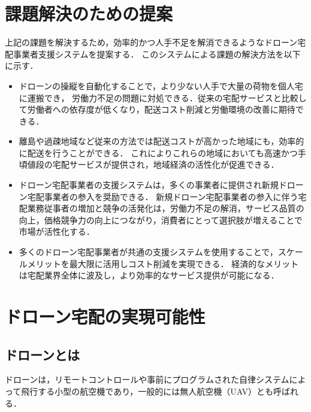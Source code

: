 \documentclass[a4paper, titlepage]{jsarticle}
\begin{document}
\section{課題解決のための提案}
上記の課題を解決するため，効率的かつ人手不足を解消できるようなドローン宅配事業者支援システムを提案する．
このシステムによる課題の解決方法を以下に示す．
\begin{itemize}
        \item ドローンの操縦を自動化することで，より少ない人手で大量の荷物を個人宅に運搬でき，
              労働力不足の問題に対処できる．従来の宅配サービスと比較して労働者への依存度が低くなり，配送コスト削減と労働環境の改善に期待できる．

        \item 離島や過疎地域など従来の方法では配送コストが高かった地域にも，効率的に配送を行うことができる．
              これによりこれらの地域においても高速かつ手頃値段の宅配サービスが提供され，地域経済の活性化が促進できる．

        \item ドローン宅配事業者の支援システムは，多くの事業者に提供され新規ドローン宅配事業者の参入を奨励できる．
              新規ドローン宅配事業者の参入に伴う宅配業務従事者の増加と競争の活発化は，労働力不足の解消，サービス品質の向上，価格競争力の向上につながり，消費者にとって選択肢が増えることで市場が活性化する．

        \item 多くのドローン宅配事業者が共通の支援システムを使用することで，スケールメリットを最大限に活用しコスト削減を実現できる．
              経済的なメリットは宅配業界全体に波及し，より効率的なサービス提供が可能になる．


\end{itemize}

\section{ドローン宅配の実現可能性}
\subsection{ドローンとは}
ドローンは，リモートコントロールや事前にプログラムされた自律システムによって飛行する小型の航空機であり，一般的には無人航空機（UAV）とも呼ばれる．
\end{document}

